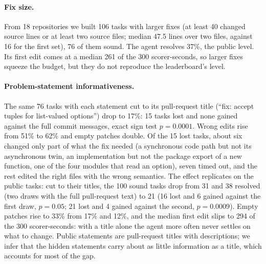 \documentclass[11pt]{article}
\begin{document}
\paragraph{Fix size.} From 18 repositories we built 106 tasks with larger fixes (at least 40 changed source lines or at least two source files; median 47.5 lines over two files, against 16 for the first set), 76 of them sound. The agent resolves 37\%, the public level. Its first edit comes at a median 261 of the 300 scorer-seconds, so larger fixes squeeze the budget, but they do not reproduce the leaderboard's level.

\paragraph{Problem-statement informativeness.} The same 76 tasks with each statement cut to its pull-request title (``fix: accept tuples for list-valued options'') drop to 17\%: 15 tasks lost and none gained against the full commit messages, exact sign test $p = 0.0001$. Wrong edits rise from 51\% to 62\% and empty patches double. Of the 15 lost tasks, about six changed only part of what the fix needed (a synchronous code path but not its asynchronous twin, an implementation but not the package export of a new function, one of the four modules that read an option), seven timed out, and the rest edited the right files with the wrong semantics. The effect replicates on the public tasks: cut to their titles, the 100 sound tasks drop from 31 and 38 resolved (two draws with the full pull-request text) to 21 (16 lost and 6 gained against the first draw, $p = 0.05$; 21 lost and 4 gained against the second, $p = 0.0009$). Empty patches rise to 33\% from 17\% and 12\%, and the median first edit slips to 294 of the 300 scorer-seconds: with a title alone the agent more often never settles on what to change. Public statements are pull-request titles with descriptions; we infer that the hidden statements carry about as little information as a title, which accounts for most of the gap.
\end{document}
